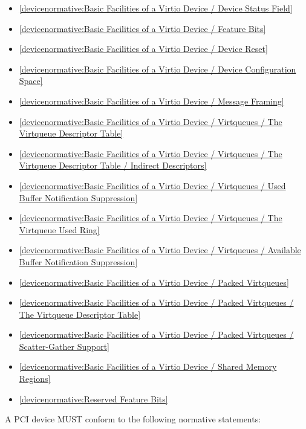 \begin{itemize}
\item \ref{devicenormative:Basic Facilities of a Virtio Device / Device Status Field}
\item \ref{devicenormative:Basic Facilities of a Virtio Device / Feature Bits}
\item \ref{devicenormative:Basic Facilities of a Virtio Device / Device Reset}
\item \ref{devicenormative:Basic Facilities of a Virtio Device / Device Configuration Space}
\item \ref{devicenormative:Basic Facilities of a Virtio Device / Message Framing}
\item \ref{devicenormative:Basic Facilities of a Virtio Device / Virtqueues / The Virtqueue Descriptor Table}
\item \ref{devicenormative:Basic Facilities of a Virtio Device / Virtqueues / The Virtqueue Descriptor Table / Indirect Descriptors}
\item \ref{devicenormative:Basic Facilities of a Virtio Device / Virtqueues / Used Buffer Notification Suppression}
\item \ref{devicenormative:Basic Facilities of a Virtio Device / Virtqueues / The Virtqueue Used Ring}
\item \ref{devicenormative:Basic Facilities of a Virtio Device / Virtqueues / Available Buffer Notification Suppression}
\item \ref{devicenormative:Basic Facilities of a Virtio Device / Packed Virtqueues}
\item \ref{devicenormative:Basic Facilities of a Virtio Device / Packed Virtqueues / The Virtqueue Descriptor Table}
\item \ref{devicenormative:Basic Facilities of a Virtio Device / Packed Virtqueues / Scatter-Gather Support}
\item \ref{devicenormative:Basic Facilities of a Virtio Device / Shared Memory Regions}
\item \ref{devicenormative:Reserved Feature Bits}
\end{itemize}

\label{sec:Conformance / Device Conformance / PCI Device Conformance}

A PCI device MUST conform to the following normative statements:

